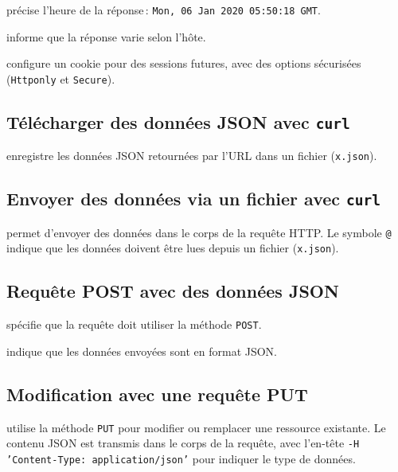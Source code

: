 \documentclass[a4paper]{report}
\begin{document}
\noindent{} précise l’heure de la réponse : \texttt{Mon, 06 Jan 2020 05:50:18 GMT}.  

\noindent{} informe que la réponse varie selon l’hôte.  

\noindent{} configure un cookie pour des sessions futures, 
avec des options sécurisées (\texttt{Httponly} et \texttt{Secure}).


\subsection{Télécharger des données JSON avec \texttt{curl}}
enregistre les données JSON retournées par l'URL dans un fichier (\texttt{x.json}).

\subsection{Envoyer des données via un fichier avec \texttt{curl}}
permet d'envoyer des données dans le corps de la requête HTTP. Le symbole 
\texttt{@} indique que les données doivent être lues depuis un fichier 
(\texttt{x.json}).

\subsection{Requête POST avec des données JSON}
spécifie que la requête doit utiliser la méthode \texttt{POST}. 

\noindent{}
indique que les données envoyées sont en format JSON.

\subsection{Modification avec une requête PUT}
utilise la méthode \texttt{PUT} pour modifier ou remplacer une ressource existante. 
Le contenu JSON est transmis dans le corps de la requête, avec l'en-tête
\texttt{-H 'Content-Type: application/json'} pour indiquer le type de données.
\end{document}
